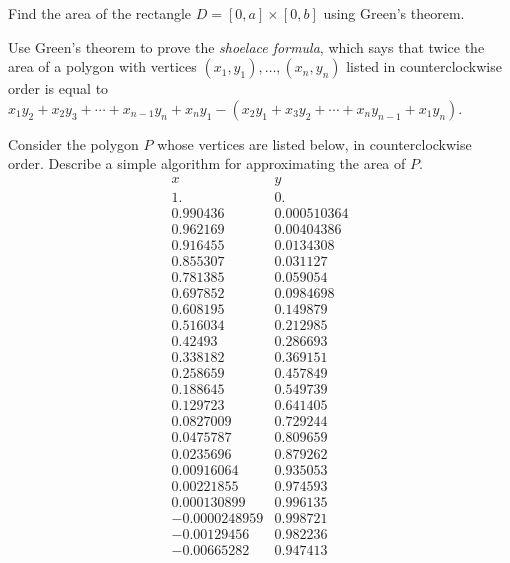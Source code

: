 \documentclass{watsonbook}
\begin{document}

\begin{aexercise}
  Find the area of the rectangle $D=[0,a]\times[0,b]$ using Green's
  theorem.
\end{aexercise}

\begin{aexercise}
Use Green's theorem to prove the \textit{shoelace
  formula}, which says that twice the area of a polygon with vertices
$(x_1,y_1),\ldots,(x_n,y_n)$ listed in counterclockwise order is equal
to 
$x_1y_2 + x_2 y_3 + \cdots + x_{n-1}y_n + x_n y_1 - (x_2 y_1 + x_3 y_2
+ \cdots + x_{n}y_{n-1}+ x_1 y_n)$.
\end{aexercise}

\begin{aexercise}
Consider the polygon $P$ whose vertices are listed below, in counterclockwise order. Describe a simple algorithm for approximating the area of $P$. 
{\tiny
  $$
\begin{array}{cc}
  x & y \\ \hline 
 1. & 0. \\
 0.990436 & 0.000510364 \\
 0.962169 & 0.00404386 \\
 0.916455 & 0.0134308 \\
 0.855307 & 0.031127 \\
 0.781385 & 0.059054 \\
 0.697852 & 0.0984698 \\
 0.608195 & 0.149879 \\
 0.516034 & 0.212985 \\
 0.42493 & 0.286693 \\
 0.338182 & 0.369151 \\
 0.258659 & 0.457849 \\
 0.188645 & 0.549739 \\
 0.129723 & 0.641405 \\
 0.0827009 & 0.729244 \\
 0.0475787 & 0.809659 \\
 0.0235696 & 0.879262 \\
 0.00916064 & 0.935053 \\
 0.00221855 & 0.974593 \\
 0.000130899 & 0.996135 \\
 -0.0000248959 & 0.998721 \\
 -0.00129456 & 0.982236 \\
 -0.00665282 & 0.947413 \\

\end{array}$$}
\end{aexercise}
\end{document}
